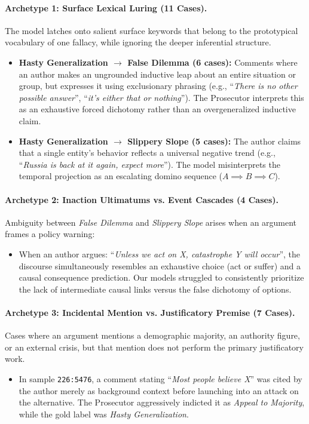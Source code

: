 \documentclass[11pt]{article}
\begin{document}
\paragraph{Archetype 1: Surface Lexical Luring (11 Cases).}
The model latches onto salient surface keywords that belong to the prototypical vocabulary of one fallacy, while ignoring the deeper inferential structure.
\begin{itemize}[leftmargin=*,itemsep=1pt,topsep=2pt]
    \item \textbf{Hasty Generalization $\to$ False Dilemma (6 cases):} Comments where an author makes an ungrounded inductive leap about an entire situation or group, but expresses it using exclusionary phrasing (e.g., ``\textit{There is no other possible answer}'', ``\textit{it's either that or nothing}''). The Prosecutor interprets this as an exhaustive forced dichotomy rather than an overgeneralized inductive claim.
    \item \textbf{Hasty Generalization $\to$ Slippery Slope (5 cases):} The author claims that a single entity's behavior reflects a universal negative trend (e.g., ``\textit{Russia is back at it again, expect more}''). The model misinterprets the temporal projection as an escalating domino sequence ($A \implies B \implies C$).
\end{itemize}

\paragraph{Archetype 2: Inaction Ultimatums vs. Event Cascades (4 Cases).}
Ambiguity between \textit{False Dilemma} and \textit{Slippery Slope} arises when an argument frames a policy warning:
\begin{itemize}[leftmargin=*,itemsep=1pt,topsep=2pt]
    \item When an author argues: ``\textit{Unless we act on X, catastrophe Y will occur}'', the discourse simultaneously resembles an exhaustive choice (act or suffer) and a causal consequence prediction. Our models struggled to consistently prioritize the lack of intermediate causal links versus the false dichotomy of options.
\end{itemize}

\paragraph{Archetype 3: Incidental Mention vs. Justificatory Premise (7 Cases).}
Cases where an argument mentions a demographic majority, an authority figure, or an external crisis, but that mention does not perform the primary justificatory work.
\begin{itemize}[leftmargin=*,itemsep=1pt,topsep=2pt]
    \item In sample \texttt{226:5476}, a comment stating ``\textit{Most people believe X}'' was cited by the author merely as background context before launching into an attack on the alternative. The Prosecutor aggressively indicted it as \textit{Appeal to Majority}, while the gold label was \textit{Hasty Generalization}.
\end{itemize}
\end{document}
